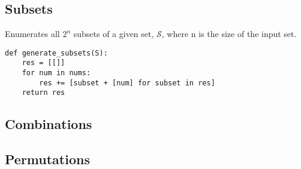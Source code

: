\subsection{Subsets}
\begin{algo}  Enumerates all $2^n$ subsets of a given set, $\mathcal{S}$, where n is the size of the input set.
\begin{lstlisting}
def generate_subsets(S):
    res = [[]]
    for num in nums:
        res += [subset + [num] for subset in res]
    return res
\end{lstlisting}
        
\end{algo}

\subsection{Combinations}
\begin{algo}
    
\end{algo}

\subsection{Permutations}
\begin{algo}
    
\end{algo}